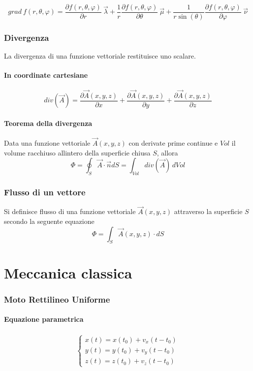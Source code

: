 \documentclass[12pt,a4paper]{report}
\begin{document}
		\[grad~f(r,\theta,\varphi) = \frac{\partial f(r,\theta,\varphi)}{\partial r} ~\vec{\lambda} + \frac{1}{r}\frac{\partial f(r,\theta,\varphi)}{\partial \theta} ~\vec{\mu} + \frac{1}{r\sin(\theta)}\frac{\partial f(r,\theta,\varphi)}{ \partial \varphi} ~\vec{\nu} \]

	\subsection{Divergenza}
La divergenza di una funzione vettoriale restituisce uno scalare.

		\subsubsection{In coordinate cartesiane} 
		\[div(\vec{A}) =  \frac{\partial \vec{A}(x,y,z)}{\partial x} + \frac{\partial 	\vec{A}(x,y,z)}{\partial y} + \frac{\partial \vec{A}(x,y,z)}{\partial z} \]

		\subsubsection{Teorema della divergenza}
Data una funzione vettoriale $\vec{A}(x,y,z)$ con derivate prime continue e $Vol$ il volume racchiuso allintero della superficie chiusa $S$, allora
		\[\Phi=\oint_{S} \vec{A} \cdot \vec{n} dS = \int_{Vol} div(\vec{A})\,dVol\]
	\subsection{Flusso di un vettore}
Si definisce flusso di una funzione vettoriale $\vec{A}(x,y,z)$ attraverso la superficie $S$ secondo la seguente equazione
		\[\Phi = \int_{S} \vec{A}(x,y,z) \cdot dS\]

\chapter{Meccanica classica}
	\subsection{Moto Rettilineo Uniforme }
		\subsubsection{Equazione parametrica}
		\begin{align*} 
		\begin{cases} x(t)= x(t_{0})+v_{x}(t-t_{0})\\y(t)= y(t_{0})+v_{y}(t-t_{0})\\z(t)= z(t_{0})+v_{z}(t-t_{0}) \end{cases}
		\end{align*}
	
\end{document}
